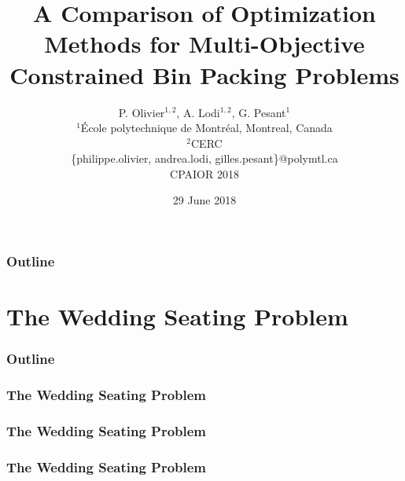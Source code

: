 \documentclass{beamer}
\title[Comparison of Optimization Methods]{A Comparison of Optimization Methods for Multi-Objective Constrained Bin Packing Problems}
\author[P. Olivier, A. Lodi, G. Pesant] {
  P. Olivier$^{1,2}$, A. Lodi$^{1,2}$, G. Pesant$^{1}$ \\
  \vspace{0.5cm}
  \scriptsize $^1$École polytechnique de Montréal, Montreal, Canada \\
  \scriptsize $^2$CERC \\
  \{philippe.olivier, andrea.lodi, gilles.pesant\}@polymtl.ca \\
  \vspace{1cm}
  \normalsize CPAIOR 2018
}
\date[CPAIOR 2018]{29 June 2018}
\newcommand{\AutoSectionTitle}{}
\begin{document}
\begin{frame}
  \titlepage
\end{frame}

\begin{frame}
  \frametitle{Outline}
  \tableofcontents
\end{frame}




\renewcommand{\AutoSectionTitle}{The Wedding Seating Problem}

\section{\AutoSectionTitle}

\begin{frame}
  \frametitle{Outline}
  \tableofcontents[currentsection]
\end{frame}




\begin{frame}
  \frametitle{\AutoSectionTitle}
  
  \begin{center}
    
  \end{center}
  
\end{frame}




\begin{frame}
  \frametitle{\AutoSectionTitle}
  
  \begin{center}
    
  \end{center}
  
\end{frame}




\begin{frame}
  \frametitle{\AutoSectionTitle}
  
  \begin{center}
    
  \end{center}
  
\end{frame}
\end{document}
